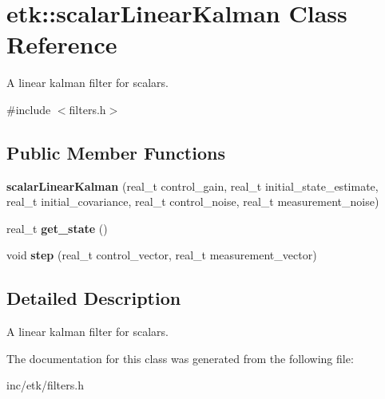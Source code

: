 \hypertarget{classetk_1_1scalar_linear_kalman}{\section{etk\-:\-:scalar\-Linear\-Kalman Class Reference}
\label{classetk_1_1scalar_linear_kalman}
}


A linear kalman filter for scalars.  




{\ttfamily \#include $<$filters.\-h$>$}

\subsection*{Public Member Functions}
\begin{DoxyCompactItemize}
\item 
\hypertarget{classetk_1_1scalar_linear_kalman_a8293f571afe4fc65b5d56a06e3f1248b}{{\bfseries scalar\-Linear\-Kalman} (real\-\_\-t control\-\_\-gain, real\-\_\-t initial\-\_\-state\-\_\-estimate, real\-\_\-t initial\-\_\-covariance, real\-\_\-t control\-\_\-noise, real\-\_\-t measurement\-\_\-noise)}\label{classetk_1_1scalar_linear_kalman_a8293f571afe4fc65b5d56a06e3f1248b}

\item 
\hypertarget{classetk_1_1scalar_linear_kalman_a07459daebf1f1ea5b2249a234a39cd23}{real\-\_\-t {\bfseries get\-\_\-state} ()}\label{classetk_1_1scalar_linear_kalman_a07459daebf1f1ea5b2249a234a39cd23}

\item 
\hypertarget{classetk_1_1scalar_linear_kalman_a97566314c1115701754ef5c5cb7b2ac1}{void {\bfseries step} (real\-\_\-t control\-\_\-vector, real\-\_\-t measurement\-\_\-vector)}\label{classetk_1_1scalar_linear_kalman_a97566314c1115701754ef5c5cb7b2ac1}

\end{DoxyCompactItemize}


\subsection{Detailed Description}
A linear kalman filter for scalars. 

The documentation for this class was generated from the following file\-:\begin{DoxyCompactItemize}
\item 
inc/etk/filters.\-h\end{DoxyCompactItemize}
